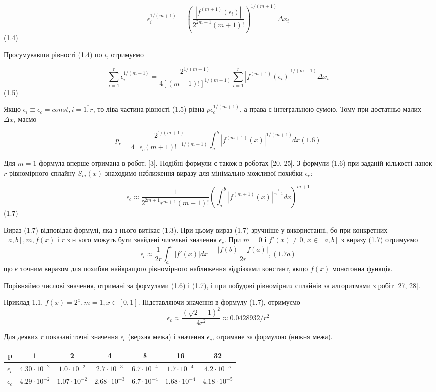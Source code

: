 \documentclass[ukrainian,14pt]{extarticle}
\begin{document}
$$\epsilon_i^{1/(m+1)} = \left(\frac {|f^{(m+1)}(\epsilon_i)|} {2^{2m+1} (m+1)!} \right)^{1/(m+1)} \Delta x_i$$(1.4)

Просумувавши рівності (1.4) по $i$, отримуємо

$$\sum_{i=1}^r \epsilon_i ^{1/(m+1)} = \frac{2^{1/(m+1)}}{4 [(m+1)!]^{1/(m+1)}} \sum_{i=1}^r |f^{(m+1)}(\epsilon_i)|^{1/(m+1)} \Delta x_i$$ (1.5)

Якщо $\epsilon_i \equiv \epsilon_c = const, i = \overline{1, r}$, то ліва частина рівності (1.5) рівна $p \epsilon_c ^{1/(m+1)}$, а права є інтегральною сумою. Тому при достатньо малих $\Delta x_i$ маємо

$$p_c = \frac{2^{1/(m+1)}}{4[\epsilon_c (m+1)!]^{1/(m+1)}} \int_a^b |f^{(m+1)}(x)|^{1/(m+1)}dx (1.6)$$

Для $m = 1$ формула вперше отримана в роботі [3].
Подібні формули є також в роботах [20, 25]. З формули (1.6) при заданій кількості ланок $r$ рівномірного сплайну $S_m(x)$ знаходимо наближення виразу для мінімально можливої похибки $\epsilon_c$: 

$$\epsilon_c \approx \frac{1}{2^{2m+1} r^{m+1} (m+1)!} \left( \int_a^b \left|f^{(m+1)}(x)\right|^{\frac{1}{m+1} }dx \right)^{m+1}$$ (1.7)

Вираз (1.7) відповідає формулі, яка з нього витікає (1.3). При цьому вираз (1.7) зручніше у використанні, бо при конкретних $[a, b], m, f(x)$ і $r$ з н ього можуть бути знайдені чисельні значення $\epsilon_c$. При $m = 0$ і $f'(x) \neq 0$, $x \in [a, b]$ з виразу (1.7) отримуємо
$$ \epsilon_c \approx \frac{1}{2r} \int_a^b |f'(x)|dx = \frac{|f(b) - f(a)|}{2r}, (1.7a)$$
що є точним виразом для похибки найкращого рівномірного наближення відрізками констант, якщо $f(x)$ монотонна функція.

Порівняймо числові значення, отримані за формулами (1.6) і (1.7), і при побудові рівномірних сплайнів за алгоритмами з робіт [27, 28].

Приклад 1.1. $f(x) = 2^x, m = 1, x \in [0, 1]$. Підставляючи значення в формулу (1.7), отримуємо
$$\epsilon_c \approx \frac{(\sqrt{2} - 1)^2}{4r^2} \approx 0.0428932 / r^2$$

Для деяких $r$ показані точні значення $\epsilon_c$ (верхня межа) і значення $\epsilon_c$, отримане за формулою (нижня межа).

\bgroup
\def\arraystretch{1.5}%
\begin{center}
\begin{tabular}{ c | c |
c | c | c | c | c }
 p & 1 & 2 & 4 & 8 & 16 & 32 \\
 \hline
 $\epsilon_c$ & $4.30 \cdot 10^{-2}$ & $1.0 \cdot 10^{-2}$ & $2.7 \cdot 10^{-3}$ & $6.7 \cdot 10^{-4}$ & $1.7 \cdot 10^{-4}$ & $4.2 \cdot 10^{-5}$ \\  
 \hline
 $\epsilon_c$ & $4.29 \cdot 10^{-2}$ & $1.07 \cdot 10^{-2}$ & $2.68 \cdot 10^{-3}$ & $6.7 \cdot 10^{-4}$ & $1.68 \cdot 10^{-4}$ & $4.18 \cdot 10^{-5}$    
\end{tabular}
\end{center}
\egroup
\end{document}
